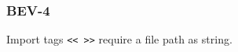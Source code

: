 \subsubsection{BEV-4}\label{sec:error_code_bev_4}

Import tags \texttt{<< >>} require a file path as string.


